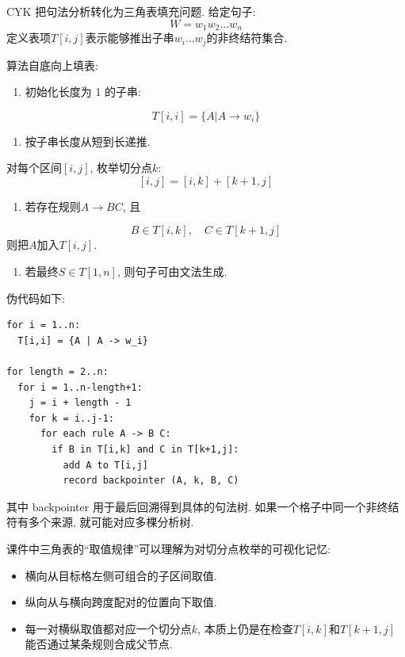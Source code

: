 CYK 把句法分析转化为三角表填充问题.
给定句子:
\[
W = w_1 w_2 \dots w_n
\]
定义表项$T[i,j]$表示能够推出子串$w_i \dots w_j$的非终结符集合.

算法自底向上填表:

\begin{enumerate}
\item[1.] 初始化长度为 1 的子串:
\end{enumerate}
\[
T[i,i] = \{A | A \to w_i\}
\]

\begin{enumerate}
\item[2.] 按子串长度从短到长递推.
\end{enumerate}
对每个区间$[i,j]$, 枚举切分点$k$:
\[
[i,j] = [i,k] + [k+1,j]
\]

\begin{enumerate}
\item[3.] 若存在规则$A \to B C$, 且
\end{enumerate}
\[
B \in T[i,k], \quad C \in T[k+1,j]
\]
则把$A$加入$T[i,j]$.

\begin{enumerate}
\item[4.] 若最终$S \in T[1,n]$, 则句子可由文法生成.
\end{enumerate}

伪代码如下:

\begin{Verbatim}[breaklines=true,breakanywhere=true,fontsize=\small]
for i = 1..n:
  T[i,i] = {A | A -> w_i}

for length = 2..n:
  for i = 1..n-length+1:
    j = i + length - 1
    for k = i..j-1:
      for each rule A -> B C:
        if B in T[i,k] and C in T[k+1,j]:
          add A to T[i,j]
          record backpointer (A, k, B, C)
\end{Verbatim}

其中 backpointer 用于最后回溯得到具体的句法树.
如果一个格子中同一个非终结符有多个来源, 就可能对应多棵分析树.

课件中三角表的“取值规律”可以理解为对切分点枚举的可视化记忆:

\begin{itemize}
\item 横向从目标格左侧可组合的子区间取值.
\item 纵向从与横向跨度配对的位置向下取值.
\item 每一对横纵取值都对应一个切分点$k$, 本质上仍是在检查$T[i,k]$和$T[k+1,j]$能否通过某条规则合成父节点.
\end{itemize}

